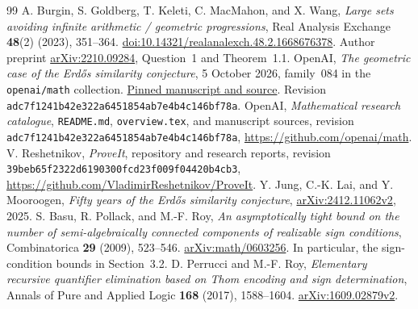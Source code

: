 \documentclass[11pt,a4paper]{article}
\theoremstyle{plain}
\theoremstyle{definition}
\theoremstyle{remark}
\begin{document}
\hypersetup{pageanchor=true}
\begingroup
\small
\setlength{\parskip}{0pt}
\tableofcontents
\endgroup
\clearpage








\appendix

\begin{thebibliography}{99}
A. Burgin, S. Goldberg, T. Keleti, C. MacMahon, and X. Wang,
\emph{Large sets avoiding infinite arithmetic / geometric progressions},
Real Analysis Exchange \textbf{48}(2) (2023), 351--364.
\href{https://doi.org/10.14321/realanalexch.48.2.1668676378}{doi:10.14321/realanalexch.48.2.1668676378}.
Author preprint \href{https://arxiv.org/abs/2210.09284}{arXiv:2210.09284},
Question~1 and Theorem~1.1.
OpenAI, \emph{The geometric case of the Erd\H{o}s similarity conjecture},
5 October 2026, family~084 in the \texttt{openai/math} collection.
\href{https://github.com/openai/math/tree/adc7f1241b42e322a6451854ab7e4b4c146bf78a/preprints/The-geometric-case-of-the-Erdos-similarity-conjecture-October-5-2026}{Pinned manuscript and source}.
Revision \texttt{adc7f1241b42e322a6451854ab7e4b4c146bf78a}.
OpenAI, \emph{Mathematical research catalogue}, \texttt{README.md},
\texttt{overview.tex}, and manuscript sources, revision
\texttt{adc7f1241b42e322a6451854ab7e4b4c146bf78a},
\url{https://github.com/openai/math}.
V. Reshetnikov, \emph{ProveIt}, repository and research reports,
revision \texttt{39beb65f2322d6190300fcd23f009f04420b4cb3},
\url{https://github.com/VladimirReshetnikov/ProveIt}.
Y. Jung, C.-K. Lai, and Y. Mooroogen,
\emph{Fifty years of the Erd\H{o}s similarity conjecture},
\href{https://arxiv.org/abs/2412.11062v2}{arXiv:2412.11062v2}, 2025.
S. Basu, R. Pollack, and M.-F. Roy,
\emph{An asymptotically tight bound on the number of semi-algebraically
connected components of realizable sign conditions},
Combinatorica \textbf{29} (2009), 523--546.
\href{https://arxiv.org/abs/math/0603256}{arXiv:math/0603256}.
In particular, the sign-condition bounds in Section~3.2.
D. Perrucci and M.-F. Roy,
\emph{Elementary recursive quantifier elimination based on Thom encoding
and sign determination}, Annals of Pure and Applied Logic \textbf{168}
(2017), 1588--1604.
\href{https://arxiv.org/abs/1609.02879v2}{arXiv:1609.02879v2}.
\end{thebibliography}
\end{document}
